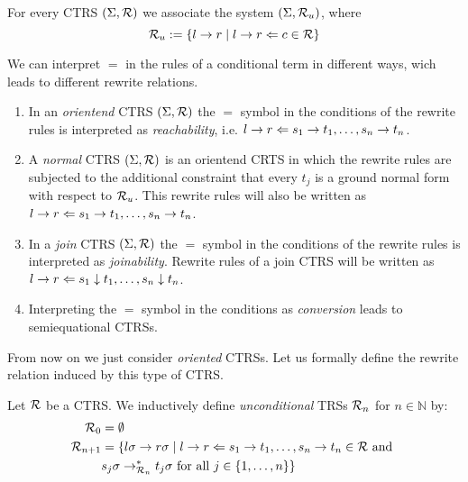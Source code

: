 \begin{definition}
    For every CTRS $(\Sigma,\mathcal{R})$ we associate the system $(\Sigma, \mathcal{R}_u)$, where
    $$\mathcal{R}_u := \{ l \rightarrow r \mid l \rightarrow r \Leftarrow c \in \mathcal{R} \} $$
\end{definition}

We can interpret $=$ in the rules of a conditional term in different ways, wich leads to different rewrite relations.

\begin{definition}
    \begin{enumerate}
        \item In an \textit{orientend} CTRS $(\Sigma, \mathcal{R})$ the $=$ symbol in the conditions of the rewrite rules is interpreted as \textit{reachability}, i.e. $l \rightarrow r \Leftarrow s_1 \rightarrow t_1, \dots, s_n \rightarrow t_n$.
        \item A \textit{normal} CTRS $(\Sigma, \mathcal{R})$ is an orientend CRTS in which the rewrite rules are subjected to the additional constraint that every $t_j$ is a ground normal form with respect to $\mathcal{R}_u$. This rewrite rules will also be written as $l \rightarrow r \Leftarrow s_1 \rightarrow t_1, \dots, s_n \rightarrow t_n$.
        \item In a \textit{join} CTRS $(\Sigma, \mathcal{R})$ the $=$ symbol in the conditions of the rewrite rules is interpreted as \textit{joinability}. Rewrite rules of a join CTRS will be written as $l \rightarrow r \Leftarrow s_1 \downarrow t_1, \dots, s_n \downarrow t_n$.
        \item Interpreting the $=$ symbol in the conditions as \textit{conversion} leads to semiequational CTRSs.
    \end{enumerate}
\end{definition}

From now on we just consider \textit{oriented} CTRSs. Let us formally define the rewrite relation induced by this type of CTRS.
\begin{definition}
    Let $\mathcal{R}$ be a CTRS. We inductively define \textit{unconditional} TRSs $\mathcal{R}_n$ for $n \in \mathbb{N}$ by:
    \begin{align*}
        \mathcal{R}_0 &= \emptyset \\
        \mathcal{R}_{n+1} &= \{ l\sigma \rightarrow r\sigma \mid l \rightarrow r \Leftarrow s_1 \rightarrow t_1, \dots, s_n \rightarrow t_n \in \mathcal{R} \text{ and } \\
        &s_j\sigma \rightarrow_{\mathcal{R}_n}^* t_j \sigma \text{ for all } j \in \{ 1, \dots, n \} \}
    \end{align*}
\end{definition}

